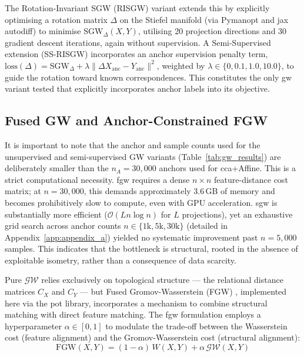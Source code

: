 The Rotation-Invariant SGW (RISGW) variant extends this by explicitly optimising a rotation matrix $\Delta$ on the Stiefel manifold (via Pymanopt and \gls{jax} autodiff) to minimise $\text{SGW}_\Delta(X, Y)$, utilising 20 projection directions and 30 gradient descent iterations, again without supervision. A Semi-Supervised extension (SS-RISGW) incorporates an anchor supervision penalty term, $\text{loss}(\Delta) = \text{SGW}_\Delta + \lambda \|\Delta X_{\text{anc}} - Y_{\text{anc}}\|^2$, weighted by $\lambda \in \{0, 0.1, 1.0, 10.0\}$, to guide the rotation toward known correspondences. This constitutes the only \gls{gw} variant tested that explicitly incorporates anchor labels into its objective.

\subsection{Fused GW and Anchor-Constrained FGW}
\label{subsec:fused_gw}

It is important to note that the anchor and sample counts used for the unsupervised and semi-supervised GW variants (Table~\ref{tab:gw_results}) are deliberately smaller than the $n_A = 30{,}000$ anchors used for \gls{cca}+Affine. This is a strict computational necessity. \gls{fgw} requires a dense $n \times n$ feature-distance cost matrix; at $n = 30{,}000$, this demands approximately 3.6\,GB of memory and becomes prohibitively slow to compute, even with GPU acceleration. \gls{sgw} is substantially more efficient ($\mathcal{O}(Ln\log n)$ for $L$ projections), yet an exhaustive grid search across anchor counts $n \in \{1\text{k}, 5\text{k}, 30\text{k}\}$ (detailed in Appendix~\ref{app:appendix_a}) yielded no systematic improvement past $n=5{,}000$ samples. This indicates that the bottleneck is structural, rooted in the absence of exploitable isometry, rather than a consequence of data scarcity.

Pure $\mathcal{GW}$ relies exclusively on topological structure --- the relational distance matrices $C_X$ and $C_Y$ --- but Fused Gromov-Wasserstein (FGW) \cite{vayer2019optimal}, implemented here via the \gls{pot} library, incorporates a mechanism to combine structural matching with direct feature matching. The \gls{fgw} formulation employs a hyperparameter $\alpha \in [0, 1]$ to modulate the trade-off between the Wasserstein cost (feature alignment) and the Gromov-Wasserstein cost (structural alignment):
\begin{equation}
\text{FGW}(X, Y) = (1 - \alpha)\,W(X, Y) + \alpha\,\mathcal{GW}(X, Y)
\label{eq:fgw}
\end{equation}

